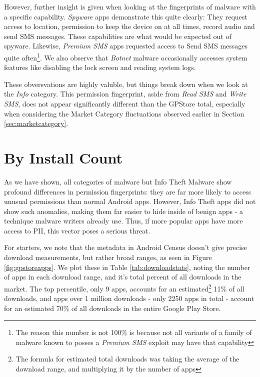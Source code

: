 However, further insight is given when looking at the fingerprints of malware with a specific capability. \textit{Spyware} apps demonstrate this quite clearly: They request access to location, permission to keep the device on at all times, record audio and send SMS messages. These capabilities are what would be expected out of spyware. Likewise, \textit{Premium SMS} apps requested access to Send SMS messages quite often\footnote{The reason this number is not 100\% is because not all variants of a family of malware known to posses a \textit{Premium SMS} exploit may have that capability}. We also observe that \textit{Botnet} malware occasionally accesses system features like disabling the lock screen and reading system logs.

These obversvations are highly valuble, but things break down when we look at the \textit{Info} category. This permission fingerprint, aside from \textit{Read SMS} and \textit{Write SMS}, does not appear significantly different than the GPStore total, especially when considering the Market Category fluctuations observed earlier in Section \ref{sec:marketcategory}. 


\section{By Install Count}
As we have shown, all categories of malware but Info Theft Malware show profound differences in permission fingerprints: they are far more likely to access unusual permissions than normal Android apps. However, Info Theft apps did not show such anomalies, making them far easier to hide inside of benign apps - a technique malware writers already use\citep{avastfakeapps}. Thus, if more popular apps have more access to PII, this vector poses a serious threat.

For starters, we note that the metadata in Android Census doesn't give precise download measurements, but rather broad ranges, as seen in Figure \ref{fig:gpstoreapps}. We plot these in Table \ref{tab:downloadstats}, noting the number of apps in each download range, and it's total percent of all downloads in the market. The top percentile, only 9 apps, accounts for an estimated\footnote{The formula for estimated total downloads was taking the average of the download range, and multiplying it by the number of apps} 11\% of all downloads, and apps over 1 million downloads - only 2250 apps in total - account for an estimated 70\% of all downloads in the entire Google Play Store.

